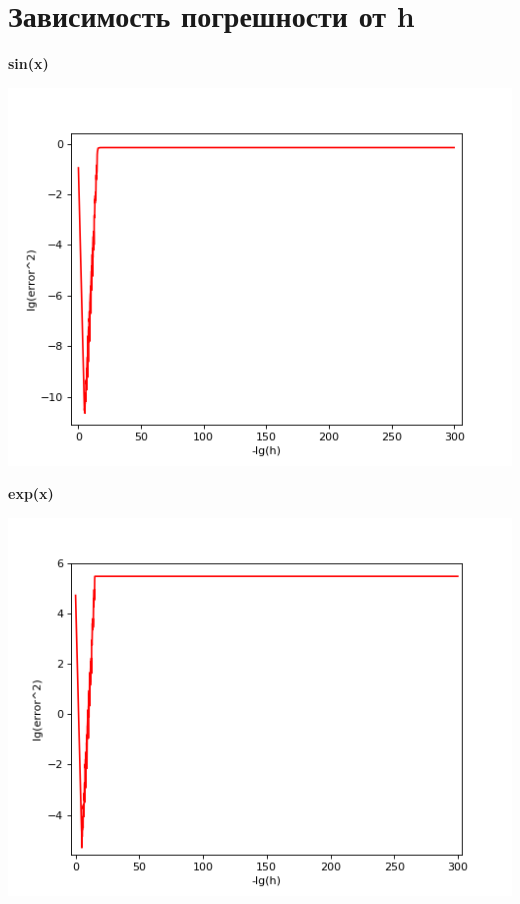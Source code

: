 \documentclass[12pt,a4paper]{scrartcl}
\begin{document}
	\section{Зависимость погрешности от h }
		\textbf{sin(x)}
			\begin{center}
				\includegraphics[scale=0.73]{figure_3} \\
			\end{center}
		\textbf{exp(x)}
			\begin{center}
				\includegraphics[scale=0.74]{figure_4} \\
			\end{center}
\end{document}
